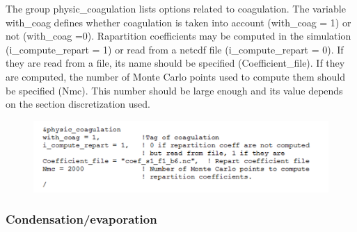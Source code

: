 \documentclass[a4paper,11pt]{article}
\begin{document}
The group physic\_coagulation lists options related to coagulation. The variable with\_coag defines whether coagulation is taken into account (with\_coag = 1) or not (with\_coag =0). 
Rapartition coefficients may be computed in the simulation (i\_compute\_repart = 1) or read from a netcdf file (i\_compute\_repart = 0). If they are read from a file, its name should be specified (Coefficient\_file). If they are computed, the number of Monte Carlo points used to compute them should be specified (Nmc). This number should be large enough and its value depends on the section discretization used.


\begin{figure}[H]
        \begin{center}
                \includegraphics[angle=0,width=\textwidth]{fig/coagulation.png}
        \end{center}
\end{figure}
          
\subsubsection{Condensation/evaporation}
\end{document}
